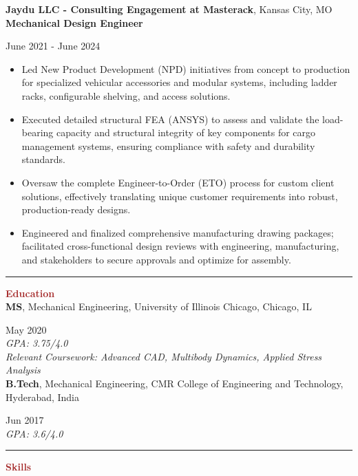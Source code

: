 \documentclass[11pt, letterpaper]{article}
\begin{document}
\textbf{Jaydu LLC - Consulting Engagement at Masterack}, Kansas City, MO\\
\textbf{Mechanical Design Engineer}\hfill \raggedright{June 2021 - June 2024}\\ %
\begin{itemize}[leftmargin=*, label=\textbullet]
\setlength\itemsep{-2pt}
\vspace{-8pt}
\item Led New Product Development (NPD) initiatives from concept to production for specialized vehicular accessories and modular systems, including ladder racks, configurable shelving, and access solutions.
\item Executed detailed structural FEA (ANSYS) to assess and validate the load-bearing capacity and structural integrity of key components for cargo management systems, ensuring compliance with safety and durability standards.
\item Oversaw the complete Engineer-to-Order (ETO) process for custom client solutions, effectively translating unique customer requirements into robust, production-ready designs.
\item Engineered and finalized comprehensive manufacturing drawing packages; facilitated cross-functional design reviews with engineering, manufacturing, and stakeholders to secure approvals and optimize for assembly.
\end{itemize}
\vspace{-8pt}
\noindent \rule[2pt]{\textwidth}{0.5pt}
\noindent \textbf{\large \textcolor{Brown}{Education}}\vspace{2pt}\\
\textbf{MS}, Mechanical Engineering, University of Illinois Chicago, Chicago, IL \hfill \raggedright{May 2020}\\
\textit{GPA: 3.75/4.0}\\
\textit{Relevant Coursework: Advanced CAD, Multibody Dynamics, Applied Stress Analysis}\\ %
\vspace{6pt}
\textbf{B.Tech}, Mechanical Engineering, CMR College of Engineering and Technology, Hyderabad, India \hfill \raggedright{Jun 2017}\\
\textit{GPA: 3.6/4.0}\\
\vspace{-2pt}
 \noindent \rule[2pt]{\textwidth}{0.5pt}
\noindent \textbf{\large \textcolor{Brown}{Skills}}\vspace{2pt}\\
\end{document}
